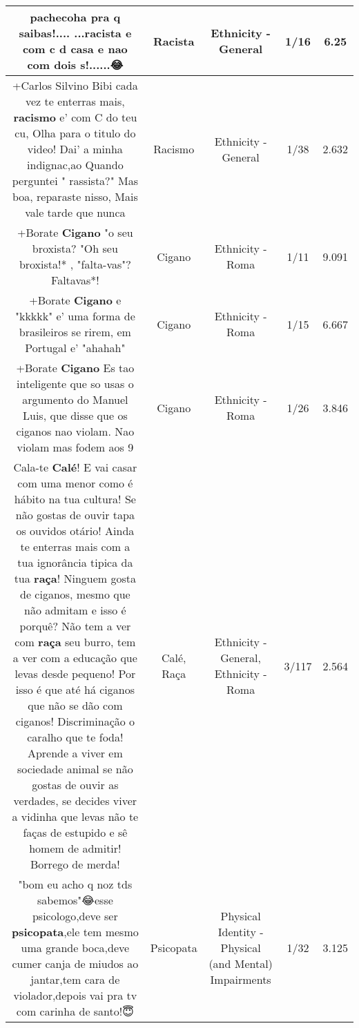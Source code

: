 \documentclass[11pt]{article}
\newlength\mylength
\begin{document}
\begin{center}
\begin{longtable}{|C{.65\mylength}|C{.30\mylength}|C{.12\mylength}|C{.12\mylength}|C{.12\mylength}|}
  \small pachecoha pra q saibas!....   ...\textbf{racista} e com c d casa e nao com dois s!......😂\normalsize   & Racista & Ethnicity - General & 1/16 & 6.25 \\  \hline
  \small +Carlos Silvino Bibi cada vez te enterras mais, \textbf{racismo} e' com C do teu cu, Olha para o titulo do video! Dai' a minha indignac,ao Quando perguntei " rassista?" Mas boa, reparaste nisso, Mais vale tarde que nunca\normalsize   & Racismo & Ethnicity - General & 1/38 & 2.632 \\  \hline
  \small +Borate \textbf{Cigano} "o seu broxista? "Oh seu broxista!* , "falta-vas"? Faltavas*!\normalsize   & Cigano & Ethnicity - Roma & 1/11 & 9.091 \\  \hline
  \small +Borate \textbf{Cigano} e "kkkkk" e' uma forma de brasileiros se rirem, em Portugal e' "ahahah"\normalsize   & Cigano & Ethnicity - Roma & 1/15 & 6.667 \\  \hline
  \small +Borate \textbf{Cigano} Es tao inteligente que so usas o argumento do Manuel Luis, que disse que os ciganos nao violam. Nao violam mas fodem aos 9\normalsize   & Cigano & Ethnicity - Roma & 1/26 & 3.846 \\  \hline
  \small Cala-te \textbf{Calé}! E vai casar com uma menor como é hábito na tua cultura! Se não gostas de ouvir tapa os ouvidos otário! Ainda te enterras mais com a tua ignorância tipica da tua \textbf{raça}! Ninguem gosta de ciganos, mesmo que não admitam e isso é porquê? Não tem a ver com \textbf{raça} seu burro, tem a ver com a educação que levas desde pequeno! Por isso é que até há ciganos que não se dão com ciganos! Discriminação o caralho que te foda! Aprende a viver em sociedade animal se não gostas de ouvir as verdades, se decides viver a vidinha que levas não te faças de estupido e sê homem de admitir! Borrego de merda!\normalsize   & Calé, Raça & Ethnicity - General, Ethnicity - Roma & 3/117 & 2.564 \\  \hline
  \small "bom eu acho q noz tds sabemos"😂esse psicologo,deve ser \textbf{psicopata},ele tem mesmo uma grande boca,deve cumer canja de miudos ao jantar,tem cara de violador,depois vai pra tv com carinha de santo!😇\normalsize   & Psicopata & Physical Identity - Physical (and Mental) Impairments & 1/32 & 3.125 \\  \hline

\end{longtable}
\end{center}
\end{document}
